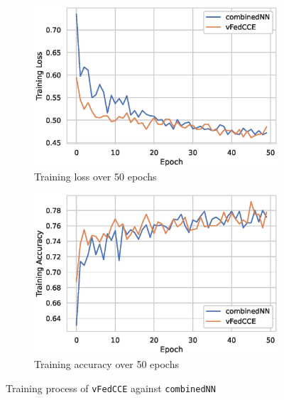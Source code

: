 \documentclass{article}
\begin{document}
\begin{figure}[h]
\centering
\begin{subfigure}{.5\textwidth}
  \centering
  \includegraphics[width=\linewidth]{./images/vfl_train_loss.eps}
  \caption{Training loss over 50 epochs}
  \label{fig:vflloss}
\end{subfigure}%
\begin{subfigure}{.5\textwidth}
  \centering
  \includegraphics[width=\linewidth]{./images/vfl_train_acc.eps}
  \caption{Training accuracy over 50 epochs}
  \label{fig:vflacc}
\end{subfigure}
\caption{Training process of \texttt{vFedCCE} against \texttt{combinedNN}}
\label{fig:vflexp}
\end{figure}

\begin{table}[h]
\centering
\caption{Learning outcome on testing data of \texttt{vFedCCE} against \texttt{combinedNN}}
\label{vfltest}
\end{table}



\end{document}

